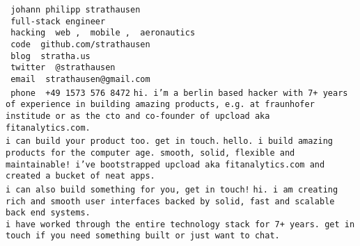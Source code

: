 \documentclass[a5paper,landscape]{article}
\newcommand{\blue}[1]{\texttt{\color{Green} #1}}
\newcommand{\red}[1]{\texttt{\color{WildStrawberry} #1}}
\begin{document}
\noindent
\huge
\red{johann philipp strathausen} \\
\blue{full-stack engineer} \\
\blue{hacking }\red{web}\blue{, }\red{mobile}\blue{, }\red{aeronautics} \\
\red{code }\blue{github.com/strathausen} \\
\red{blog }\blue{stratha.us} \\
\red{twitter }\blue{@strathausen} \\
\red{email }\blue{strathausen@gmail.com} \\
\red{phone }\blue{+49 1573 576 8472} %
\clearpage
\pagecolor{MidnightBlue}
\color{White}
\noindent
\texttt{hi.
  i'm a berlin based hacker with
  7+ years of experience in building amazing products,
  e.g. at fraunhofer institude or
  as the cto and co-founder of upcload aka
  fitanalytics.com. \\
  i can build your product too.  get in touch.}
\newpage
\noindent
\texttt{hello. i build amazing products for the computer age.
  smooth, solid, flexible and maintainable!
  i've bootstrapped upcload aka fitanalytics.com and
  created a bucket of neat apps.\\
  i can also build something for you, get in touch!}
\newpage
\noindent
\texttt{hi. i am creating rich and smooth
  user interfaces backed by solid, fast and scalable back end
  systems.\\
  i have worked through the entire technology stack for 7+ years.
  get in touch if you need something built or just want to chat.}
\end{document}
